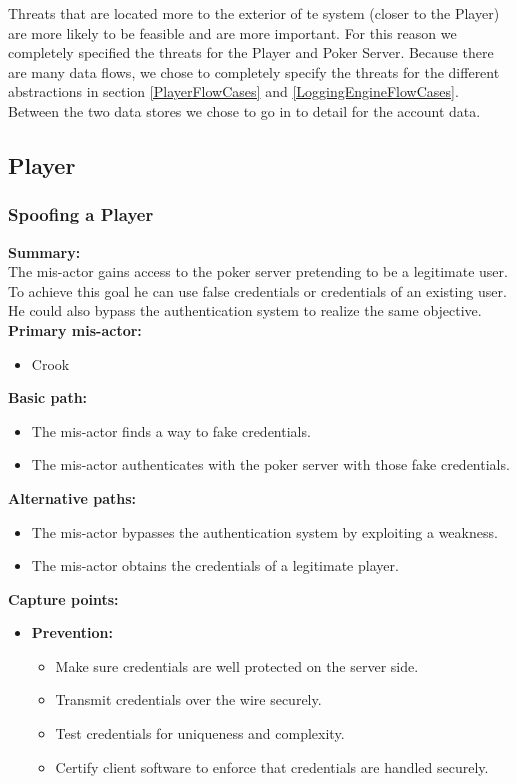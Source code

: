 \documentclass[a4paper,11pt]{report}
\begin{document}
Threats that are located more to the exterior of te system (closer to the Player) are more likely to be feasible and are more important. For this reason we completely specified the threats for the Player and Poker Server. Because there are many data flows, we chose to completely specify the threats for the different abstractions in section \ref{PlayerFlowCases} and \ref{LoggingEngineFlowCases}. Between the two data stores we chose to go in to detail for the account data.

\subsection{Player}
\label{PlayerCases}
\subsubsection{Spoofing a Player}
\label{PlayerCasesS}
\textbf{Summary:} \\
The mis-actor gains access to the poker server pretending to be a legitimate user. To achieve this goal he can use false credentials or credentials of an existing user. He could also bypass the authentication system to realize the same objective. \\
\textbf{Primary mis-actor:}
\begin{itemize}
\item Crook
\end{itemize}
\textbf{Basic path:}
\begin{itemize}
\item The mis-actor finds a way to fake credentials.
\item The mis-actor authenticates with the poker server with those fake credentials.
\end{itemize}
\textbf{Alternative paths:}
\begin{itemize}
\item The mis-actor bypasses the authentication system by exploiting a weakness.
\item The mis-actor obtains the credentials of a legitimate player.
\end{itemize}
\textbf{Capture points:}
\begin{itemize}
\item \textbf{Prevention:}
\begin{itemize}

\item Make sure credentials are well protected on the server side.
\item Transmit credentials over the wire securely.
\item Test credentials for uniqueness and complexity.
\item Certify client software to enforce that credentials are handled securely.
\end{itemize}
\end{itemize}
\end{document}
